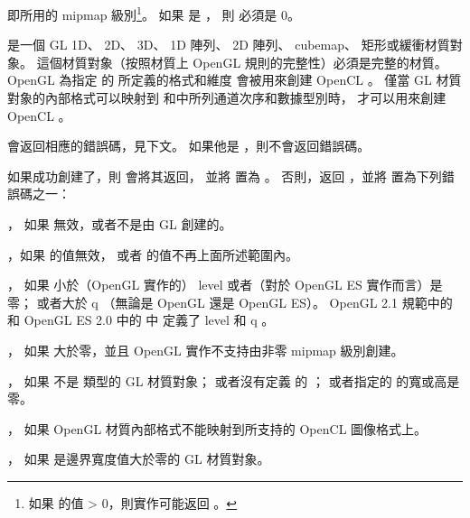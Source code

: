  即所用的 mipmap 級別\footnote{%
如果  的值 > 0，則實作可能返回 。}。
如果  是 ，
則  必須是 0。

 是一個 GL 1D、 2D、 3D、 1D 陣列、 2D 陣列、 cubemap、 矩形或緩衝材質對象。
這個材質對象（按照材質上 OpenGL 規則的完整性）必須是完整的材質。
OpenGL 為指定  的  所定義的格式和維度
會被用來創建 OpenCL 。
僅當 GL 材質對象的內部格式可以映射到
和中所列通道次序和數據型別時，
才可以用來創建 OpenCL 。

 會返回相應的錯誤碼，見下文。
如果他是 ，則不會返回錯誤碼。

如果成功創建了，則  會將其返回，
並將  置為 。
否則，返回 ，並將  置為下列錯誤碼之一：
\startigBase
\item {}，
如果  無效，或者不是由 GL 創建的。

\item {}，如果  的值無效，
或者  的值不再上面所述範圍內。

\item {}，
如果  小於（OpenGL 實作的） level 或者（對於 OpenGL ES 實作而言）是零；
或者大於 q （無論是 OpenGL 還是 OpenGL ES）。
 OpenGL 2.1 規範中的{} 和 OpenGL ES 2.0 中的{} 中
定義了 level 和 q 。

\item {}，
如果  大於零，並且 OpenGL 實作不支持由非零 mipmap 級別創建。

\item {}，
如果  不是  類型的 GL 材質對象；
或者沒有定義  的 ；
或者指定的  的寬或高是零。

\item {}，
如果 OpenGL 材質內部格式不能映射到所支持的 OpenCL 圖像格式上。

\item {}，
如果  是邊界寬度值大於零的 GL 材質對象。

